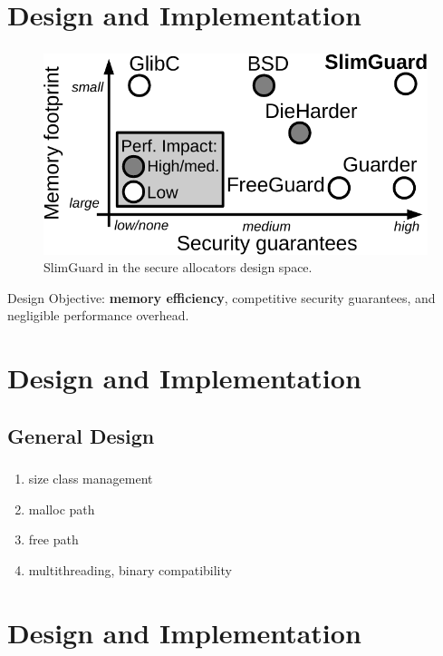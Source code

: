 \documentclass{beamer}
\begin{document}
\section{Design and Implementation}
\begin{frame}
	\frametitle{\secname}
  \begin{figure}
      \centering
      \includegraphics[scale=0.6]{design-space.pdf}
      \\SlimGuard in the secure allocators design space.
  \vspace{-4pt}
  \end{figure}
    Design Objective: \textbf{memory efficiency}, competitive security guarantees,
    and negligible performance overhead.
\end{frame}

\section{Design and Implementation}
\subsection{General Design}
\begin{frame}
	  \frametitle{\secname}
    \framesubtitle{\subsecname}
    \begin{enumerate}
        \item size class management
        \item malloc path
        \item free path
        \item multithreading, binary compatibility
    \end{enumerate}
\end{frame}

\section{Design and Implementation}
\end{document}
